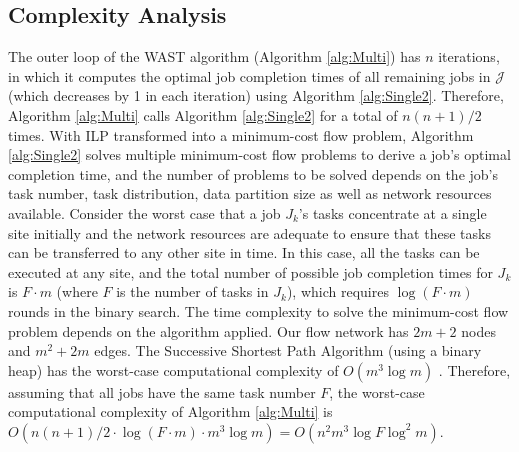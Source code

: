 \subsection{Complexity Analysis}
The outer loop of the WAST algorithm (Algorithm \ref{alg:Multi}) has $n$ iterations, in which it computes the optimal job completion times of all remaining jobs in $\mathcal{J}$ (which decreases by 1 in each iteration) using Algorithm \ref{alg:Single2}. Therefore, Algorithm \ref{alg:Multi} calls Algorithm \ref{alg:Single2} for a total of $n(n+1)/2$ times. With ILP transformed into a minimum-cost flow problem, Algorithm \ref{alg:Single2} solves multiple minimum-cost flow problems to derive a job's optimal completion time, and the number of problems to be solved depends on the job's task number, task distribution, data partition size as well as network resources available. Consider the worst case that a job $J_k$'s tasks concentrate at a single site initially and the network resources are adequate to ensure that these tasks can be transferred to any other site in time. In this case, all the tasks can be executed at any site, and the total number of possible job completion times for $J_k$ is $F\cdot m$ (where $F$ is the number of tasks in $J_k$), which requires $\log(F\cdot m)$ rounds in the binary search. The time complexity to solve the minimum-cost flow problem depends on the algorithm applied. Our flow network has $2m+2$ nodes and $m^2+2m$ edges. The Successive Shortest Path Algorithm (using a binary heap) has the worst-case computational complexity of $O(m^3\log m)$ \cite{kovacs2015minimum}. Therefore, assuming that all jobs have the same task number $F$, the worst-case computational complexity of Algorithm \ref{alg:Multi} is $O(n(n+1)/2\cdot\log(F\cdot m)\cdot m^3\log m)=O(n^2m^3\log F \log^2 m)$.


